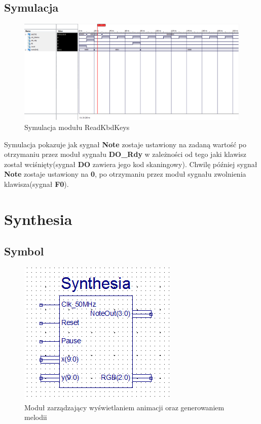 \documentclass[a4paper]{report}
\begin{document}
		\begin{landscape}
			\subsection{Symulacja}
				\begin{figure}[h!]
					\centering
					\includegraphics[width=1.6\textwidth]{readkbdkeys_symulacja2.png}
					\caption{Symulacja modułu ReadKbdKeys}
				\end{figure}
			\justify
            Symulacja pokazuje jak sygnał \textbf{Note} zostaje ustawiony na zadaną wartość po otrzymaniu przez moduł sygnału \textbf{DO\_Rdy}
            w zależności od tego jaki klawisz został wciśnięty(sygnał \textbf{DO} zawiera jego kod skaningowy). Chwilę później 
            sygnał \textbf{Note} zostaje ustawiony na \textbf{0}, po otrzymaniu przez moduł sygnału zwolnienia klawisza(sygnał \textbf{F0}).
		\end{landscape}
		
		\newpage
	\section{Synthesia}
		\subsection{Symbol}
			\begin{figure}[h!]
				\centering
				\includegraphics{synthesia2.png}
				\caption{Moduł zarządzający wyświetlaniem animacji oraz generowaniem melodii}
			\end{figure}
\end{document}
